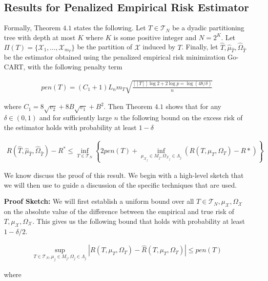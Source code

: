 \subsection{Results for Penalized Empirical Risk Estimator}

Formally, Theorem $4.1$ states the following. Let $T \in
\mathcal{T}_N$ be a dyadic partitioning tree with depth at most $K$
where $K$ is some positive integer and $N = 2^K$. Let $\Pi(T) =
\{\mathcal{X}_1, \ldots, \mathcal{X}_{m_T}\}$ be the partition of
$\mathcal{X}$ induced by $T$. Finally, let $\hat{T},
\hat{\mu}_{\hat{T}}, \hat{\Omega}_{\hat{T}}$ be the estimator obtained
using the penalized empirical risk minimization Go-CART, with the
following penalty term

\begin{align}
  pen(T) = (C_1 + 1) L_n m_T \sqrt{\frac{[[T]] \log 2 + 2 \log p = \log(48/\delta)}{n}}
\end{align}

where $C_1 = 8 \sqrt{v_2} + 8 B \sqrt{v_1} + B^2$. Then Theorem $4.1$
shows that for any $\delta \in (0, 1)$ and for sufficiently large $n$
the following bound on the excess risk of the estimator holds with
probability at least $1-\delta$

\begin{align}
  R(\hat{T}, \hat{\mu}_{\hat{T}}, \hat{\Omega}_{\hat{T}}) - R^*
  \le \inf_{T \in \mathcal{T}_N} \left\{
    2 pen(T) + \inf_{\mu_{\mathcal{X}_j} \in M_j, \Omega_{\mathcal{X}_j} \in \Lambda_j}
    (R(T, \mu_T, \Omega_T) - R*)
  \right\}
\end{align}

We know discuss the proof of this result. We begin with a high-level
sketch that we will then use to guide a discussion of the specific
techniques that are used.

\textbf{Proof Sketch:} We will first establish a uniform bound over
all $T \in \mathcal{T}_N, \mu_{\mathcal{X}}, \Omega_{\mathcal{X}}$ on
the absolute value of the difference between the empirical and true
risk of $T, \mu_{\mathcal{X}}, \Omega_{\mathcal{X}}$. This gives us
the following bound that holds with probability at least $1 -
\delta/2$.

\begin{align}
  \sup_{T \in \mathcal{T}_N, \mu_j \in M_j, \Omega_j \in \Lambda_j}
  \left|
    R(T, \mu_T, \Omega_T) - \hat{R}(T, \mu_T, \Omega_T)
  \right| \le pen(T)
\end{align}

where

